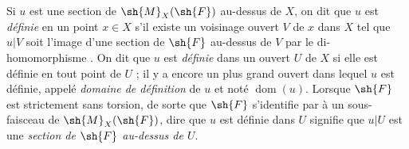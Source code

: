 \begin{env}[20.1.7]
\label{IV.20.1.7}
Si $u$ est une section de $\sh{M}_X(\sh{F})$ au-dessus de $X$, on dit que $u$ est \emph{définie} en un point $x\in X$ s'il existe un voisinage ouvert $V$ de $x$ dans $X$ tel que $u|V$ soit l'image d'une section de $\sh{F}$ au-dessus de $V$ par le di-homomorphisme .
On dit que $u$ est \emph{définie} dans un ouvert $U$ de $X$ si elle est définie en tout point de $U$ ; il y a encore un plus grand ouvert dans lequel $u$ est définie, appelé \emph{domaine de définition} de $u$ et noté $\operatorname{dom}(u)$.
Lorsque $\sh{F}$ est strictement sans torsion, de sorte que $\sh{F}$ s'identifie par  à un sous-faisceau de $\sh{M}_X(\sh{F})$, dire que $u$ est définie dans $U$ signifie que $u|U$ est une \emph{section de $\sh{F}$ au-dessus de $U$}.
\end{env}

